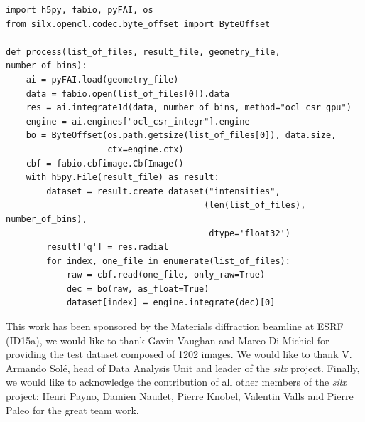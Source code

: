 \documentclass[preprint]{iucr}              %
\begin{document}
\begin{minipage}{\linewidth}
\label{parallelsnippet}
\begin{verbatim}
import h5py, fabio, pyFAI, os
from silx.opencl.codec.byte_offset import ByteOffset

def process(list_of_files, result_file, geometry_file, number_of_bins):
    ai = pyFAI.load(geometry_file)
    data = fabio.open(list_of_files[0]).data
    res = ai.integrate1d(data, number_of_bins, method="ocl_csr_gpu")
    engine = ai.engines["ocl_csr_integr"].engine
    bo = ByteOffset(os.path.getsize(list_of_files[0]), data.size,
                    ctx=engine.ctx) 
    cbf = fabio.cbfimage.CbfImage()
    with h5py.File(result_file) as result:
        dataset = result.create_dataset("intensities", 
                                       (len(list_of_files), number_of_bins),
                                        dtype='float32') 
        result['q'] = res.radial 
        for index, one_file in enumerate(list_of_files):
            raw = cbf.read(one_file, only_raw=True)
            dec = bo(raw, as_float=True)
            dataset[index] = engine.integrate(dec)[0]
\end{verbatim}
\end{minipage}

\goodbreak

This work has been sponsored by the Materials diffraction beamline at ESRF
(ID15a), we would like to thank Gavin Vaughan and Marco Di Michiel for
providing the test dataset composed of 1202 images.
We would like to thank V. Armando Solé, head of Data Analysis Unit and leader
of the \textit{silx} project. 
Finally, we would like to acknowledge the contribution of all other members
of the \textit{silx} project:
Henri Payno, Damien Naudet, Pierre Knobel, Valentin Valls and
Pierre Paleo for the great team work.



\end{document}
